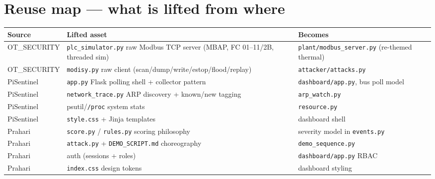 \documentclass[11pt,a4paper]{article}
\newcommand{\code}[1]{\texttt{\small #1}}
\begin{document}
\section{Reuse map --- what is lifted from where}
\begin{tabularx}{\textwidth}{@{}p{2.4cm} L L@{}}
\toprule
\textbf{Source} & \textbf{Lifted asset} & \textbf{Becomes} \\
\midrule
OT\_SECURITY & \code{plc\_simulator.py} raw Modbus TCP server (MBAP, FC 01--11/2B, threaded sim) & \code{plant/modbus\_server.py} (re-themed thermal) \\
OT\_SECURITY & \code{modisy.py} raw client (scan/dump/write/estop/flood/replay) & \code{attacker/attacks.py} \\
PiSentinel & \code{app.py} Flask polling shell + collector pattern & \code{dashboard/app.py}, bus poll model \\
PiSentinel & \code{network\_trace.py} ARP discovery + known/new tagging & \code{arp\_watch.py} \\
PiSentinel & psutil/\code{/proc} system stats & \code{resource.py} \\
PiSentinel & \code{style.css} + Jinja templates & dashboard shell \\
Prahari & \code{score.py} / \code{rules.py} scoring philosophy & severity model in \code{events.py} \\
Prahari & \code{attack.py} + \code{DEMO\_SCRIPT.md} choreography & \code{demo\_sequence.py} \\
Prahari & auth (sessions + roles) & \code{dashboard/app.py} RBAC \\
Prahari & \code{index.css} design tokens & dashboard styling \\
\bottomrule
\end{tabularx}

\end{document}
